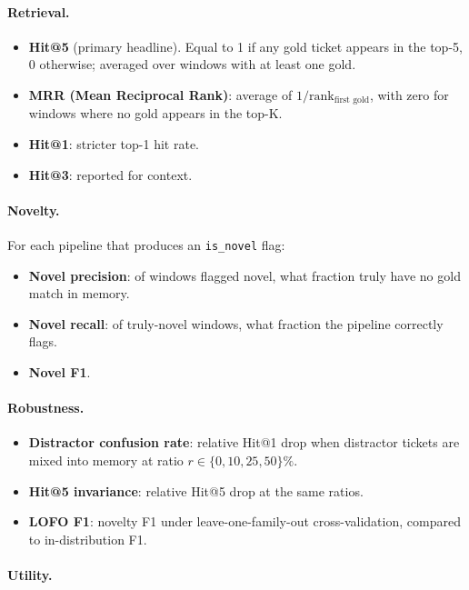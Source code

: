 \paragraph{Retrieval.}

\begin{itemize}
\item \textbf{Hit@5} (primary headline). Equal to 1 if any gold ticket appears in the top-5, 0 otherwise; averaged over windows with at least one gold.
\item \textbf{MRR (Mean Reciprocal Rank)}: average of $1 / \mathrm{rank}_{\text{first gold}}$, with zero for windows where no gold appears in the top-K.
\item \textbf{Hit@1}: stricter top-1 hit rate.
\item \textbf{Hit@3}: reported for context.
\end{itemize}

\paragraph{Novelty.} For each pipeline that produces an \texttt{is\_novel} flag:

\begin{itemize}
\item \textbf{Novel precision}: of windows flagged novel, what fraction truly have no gold match in memory.
\item \textbf{Novel recall}: of truly-novel windows, what fraction the pipeline correctly flags.
\item \textbf{Novel F1}.
\end{itemize}

\paragraph{Robustness.}

\begin{itemize}
\item \textbf{Distractor confusion rate}: relative Hit@1 drop when distractor tickets are mixed into memory at ratio $r \in \{0, 10, 25, 50\}\%$.
\item \textbf{Hit@5 invariance}: relative Hit@5 drop at the same ratios.
\item \textbf{LOFO F1}: novelty F1 under leave-one-family-out cross-validation, compared to in-distribution F1.
\end{itemize}

\paragraph{Utility.}

